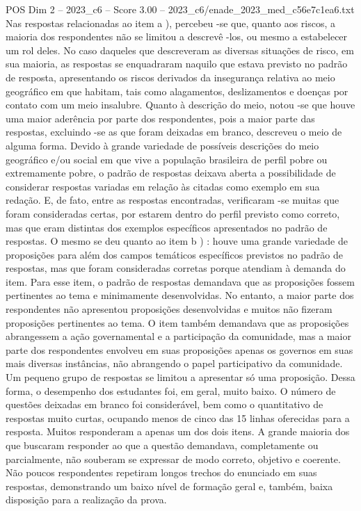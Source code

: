 \begin{textsample}{POS Dim 2 – 2023\_c6 – Score 3.00 – 2023\_c6/enade\_2023\_med\_c56e7c1ea6.txt}
Nas respostas relacionadas ao item a ), percebeu -se que, quanto aos riscos, a maioria dos respondentes não se limitou a descrevê -los, ou mesmo a estabelecer um rol deles.
No caso daqueles que descreveram as diversas situações de risco, em sua maioria, as respostas se enquadraram naquilo que estava previsto no padrão de resposta, apresentando os riscos derivados da insegurança relativa ao meio geográfico em que habitam, tais como alagamentos, deslizamentos e doenças por contato com um meio insalubre.
Quanto à descrição do meio, notou -se que houve uma maior aderência por parte dos respondentes, pois a maior parte das respostas, excluindo -se as que foram deixadas em branco, descreveu o meio de alguma forma.
Devido à grande variedade de possíveis descrições do meio geográfico e/ou social em que vive a população brasileira de perfil pobre ou extremamente pobre, o padrão de respostas deixava aberta a possibilidade de considerar respostas variadas em relação às citadas como exemplo em sua redação.
E, de fato, entre as respostas encontradas, verificaram -se muitas que foram consideradas certas, por estarem dentro do perfil previsto como correto, mas que eram distintas dos exemplos específicos apresentados no padrão de respostas.
O mesmo se deu quanto ao item b ) : houve uma grande variedade de proposições para além dos campos temáticos específicos previstos no padrão de respostas, mas que foram consideradas corretas porque atendiam à demanda do item.
Para esse item, o padrão de respostas demandava que as proposições fossem pertinentes ao tema e minimamente desenvolvidas.
No entanto, a maior parte dos respondentes não apresentou proposições desenvolvidas e muitos não fizeram proposições pertinentes ao tema.
O item também demandava que as proposições abrangessem a ação governamental e a participação da comunidade, mas a maior parte dos respondentes envolveu em suas proposições apenas os governos em suas mais diversas instâncias, não abrangendo o papel participativo da comunidade.
Um pequeno grupo de respostas se limitou a apresentar só uma proposição.
Dessa forma, o desempenho dos estudantes foi, em geral, muito baixo.
O número de questões deixadas em branco foi considerável, bem como o quantitativo de respostas muito curtas, ocupando menos de cinco das 15 linhas oferecidas para a resposta.
Muitos responderam a apenas um dos dois itens.
A grande maioria dos que buscaram responder ao que a questão demandava, completamente ou parcialmente, não souberam se expressar de modo correto, objetivo e coerente.
Não poucos respondentes repetiram longos trechos do enunciado em suas respostas, demonstrando um baixo nível de formação geral e, também, baixa disposição para a realização da prova.

\end{textsample}
